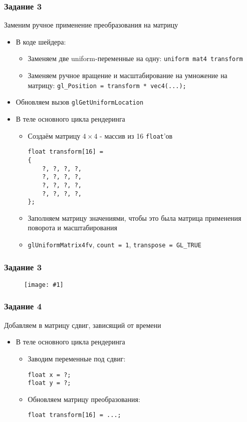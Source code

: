\documentclass{beamer}
\newcommand{\slideimage}[1]{
  \begin{figure}
    \begin{adjustbox}{width=\textwidth, totalheight=\textheight-2\baselineskip-2\baselineskip,keepaspectratio}
      \texttt{[image: \#1]}
    \end{adjustbox}
  \end{figure}
}
\begin{document}
\begin{frame}[fragile]
\frametitle{Задание 3}
Заменим ручное применение преобразования на матрицу
\begin{itemize}
\pause
\item В коде шейдера:
\begin{itemize}
\item Заменяем две uniform-переменные на одну: \verb|uniform mat4 transform|
\pause
\item Заменяем ручное вращение и масштабирование на умножение на матрицу: \verb|gl_Position = transform * vec4(...);|
\end{itemize}
\pause
\item Обновляем вызов \verb|glGetUniformLocation|
\pause
\item В теле основного цикла рендеринга
\begin{itemize}
\item Создаём матрицу \begin{math}4\times 4\end{math} - массив из 16 \verb|float|'ов
\begin{verbatim}
float transform[16] =
{
    ?, ?, ?, ?,
    ?, ?, ?, ?,
    ?, ?, ?, ?,
    ?, ?, ?, ?,
};
\end{verbatim}
\pause
\item Заполняем матрицу значениями, чтобы это была матрица применения поворота и масштабирования
\pause
\item \verb|glUniformMatrix4fv|, \verb|count = 1|, \verb|transpose = GL_TRUE|
\end{itemize}
\end{itemize}
\end{frame}

\begin{frame}
\frametitle{Задание 3}
\slideimage{2.png}
\end{frame}

\begin{frame}[fragile]
\frametitle{Задание 4}
Добавляем в матрицу сдвиг, зависящий от времени
\begin{itemize}
\pause
\item В теле основного цикла рендеринга
\begin{itemize}
\item Заводим переменные под сдвиг:
\begin{verbatim}
float x = ?;
float y = ?;
\end{verbatim}
\pause
\item Обновляем матрицу преобразования:
\begin{verbatim}
float transform[16] = ...;
\end{verbatim}
\end{itemize}
\end{itemize}
\end{frame}
\end{document}
